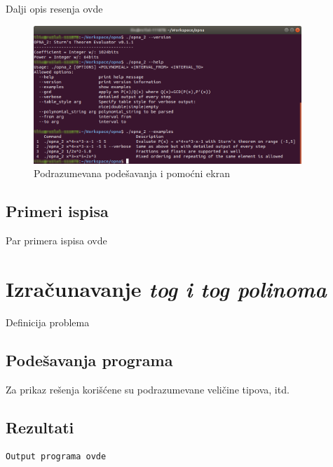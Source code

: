 \documentclass[a4paper,10pt]{article}
\begin{document}
Dalji opis resenja ovde

\begin{figure}
\begin{center}
\includegraphics[width=0.9\textwidth]{version.png}
\caption{Podrazumevana podešavanja i pomoćni ekran}
\label{fig:version}
\end{center}
\end{figure}

\subsection{Primeri ispisa}

Par primera ispisa ovde

\newpage


\section{Izračunavanje \textit{tog i tog polinoma}}
Definicija problema

\subsection{Podešavanja programa}
Za prikaz rešenja korišćene su podrazumevane veličine tipova, itd.

\subsection{Rezultati}

\begin{verbatim}
Output programa ovde 
\end{verbatim}
\end{document}
